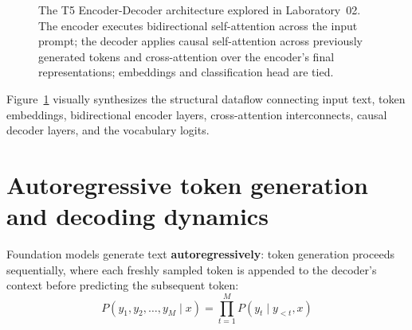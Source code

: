 \documentclass[../labs.tex]{subfiles}
\begin{document}
\begin{figure}[htbp]
\caption{The T5 Encoder-Decoder architecture explored in Laboratory~02. The encoder executes bidirectional self-attention across the input prompt; the decoder applies causal self-attention across previously generated tokens and cross-attention over the encoder's final representations; embeddings and classification head are tied.}
\label{fig:t5_full_arch}
\end{figure}

Figure~\ref{fig:t5_full_arch} visually synthesizes the structural dataflow connecting input text, token embeddings, bidirectional encoder layers, cross-attention interconnects, causal decoder layers, and the vocabulary logits.

\section{Autoregressive token generation and decoding dynamics}
\label{sec:lab02_generation}

Foundation models generate text \textbf{autoregressively}: token generation proceeds sequentially, where each freshly sampled token is appended to the decoder's context before predicting the subsequent token:
\begin{equation}
    P(y_1, y_2, \dots, y_M \mid x) = \prod_{t=1}^M P(y_t \mid y_{<t}, x)
\end{equation}
\end{document}
